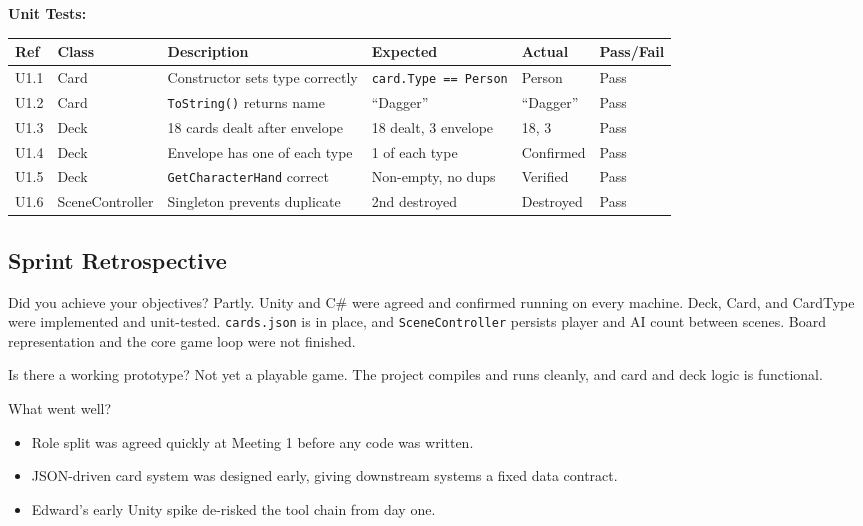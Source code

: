 \textbf{Unit Tests:}
\begin{table}[H]
\centering
\small
\begin{tabular}{|l|l|p{4.2cm}|p{2.8cm}|p{2.5cm}|l|}
\hline
\textbf{Ref} & \textbf{Class} & \textbf{Description} & \textbf{Expected} & \textbf{Actual} & \textbf{Pass/Fail} \\ \hline
U1.1 & Card & Constructor sets type correctly & \texttt{card.Type == Person} & Person & Pass \\ \hline
U1.2 & Card & \texttt{ToString()} returns name & ``Dagger'' & ``Dagger'' & Pass \\ \hline
U1.3 & Deck & 18 cards dealt after envelope & 18 dealt, 3 envelope & 18, 3 & Pass \\ \hline
U1.4 & Deck & Envelope has one of each type & 1 of each type & Confirmed & Pass \\ \hline
U1.5 & Deck & \texttt{GetCharacterHand} correct & Non-empty, no dups & Verified & Pass \\ \hline
U1.6 & SceneController & Singleton prevents duplicate & 2nd destroyed & Destroyed & Pass \\ \hline
\end{tabular}
\end{table}

\subsection*{Sprint Retrospective}

Did you achieve your objectives? Partly. Unity and C\# were agreed and confirmed running on every machine. Deck, Card, and CardType were implemented and unit-tested. \texttt{cards.json} is in place, and \texttt{SceneController} persists player and AI count between scenes. Board representation and the core game loop were not finished.

Is there a working prototype? Not yet a playable game. The project compiles and runs cleanly, and card and deck logic is functional.

What went well?
\begin{itemize}
    \item Role split was agreed quickly at Meeting 1 before any code was written.
    \item JSON-driven card system was designed early, giving downstream systems a fixed data contract.
    \item Edward's early Unity spike de-risked the tool chain from day one.
\end{itemize}

